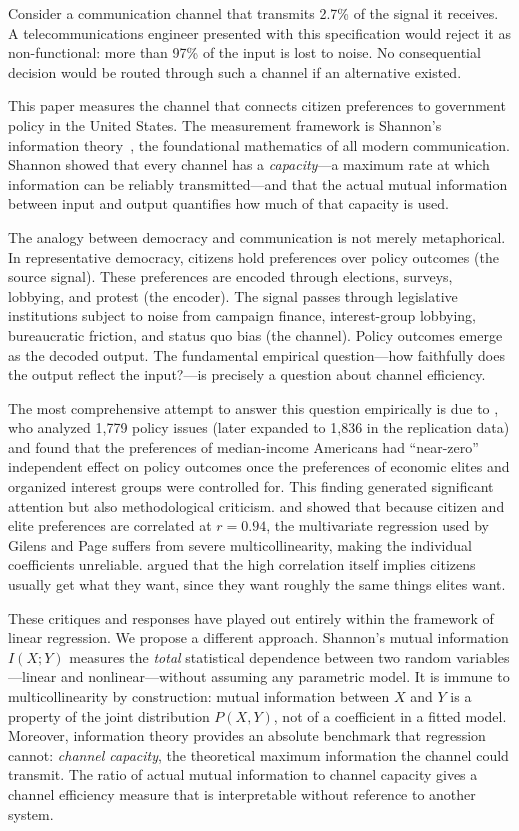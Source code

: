 \documentclass[twocolumn,10pt]{article}
\begin{document}
Consider a communication channel that transmits 2.7\% of the signal it receives.  A telecommunications engineer presented with this specification would reject it as non-functional: more than 97\% of the input is lost to noise.  No consequential decision would be routed through such a channel if an alternative existed.

This paper measures the channel that connects citizen preferences to government policy in the United States.  The measurement framework is Shannon's information theory~\citep{shannon1948}, the foundational mathematics of all modern communication.  Shannon showed that every channel has a \emph{capacity}---a maximum rate at which information can be reliably transmitted---and that the actual mutual information between input and output quantifies how much of that capacity is used.

The analogy between democracy and communication is not merely metaphorical.  In representative democracy, citizens hold preferences over policy outcomes (the source signal).  These preferences are encoded through elections, surveys, lobbying, and protest (the encoder).  The signal passes through legislative institutions subject to noise from campaign finance, interest-group lobbying, bureaucratic friction, and status quo bias (the channel).  Policy outcomes emerge as the decoded output.  The fundamental empirical question---how faithfully does the output reflect the input?---is precisely a question about channel efficiency.

The most comprehensive attempt to answer this question empirically is due to \citet{gilens2014testing}, who analyzed 1,779 policy issues (later expanded to 1,836 in the replication data) and found that the preferences of median-income Americans had ``near-zero'' independent effect on policy outcomes once the preferences of economic elites and organized interest groups were controlled for.  This finding generated significant attention but also methodological criticism.  \citet{bashir2015} and \citet{branham2017} showed that because citizen and elite preferences are correlated at $r = 0.94$, the multivariate regression used by Gilens and Page suffers from severe multicollinearity, making the individual coefficients unreliable.  \citet{enns2015} argued that the high correlation itself implies citizens usually get what they want, since they want roughly the same things elites want.

These critiques and responses have played out entirely within the framework of linear regression.  We propose a different approach.  Shannon's mutual information $I(X;Y)$ measures the \emph{total} statistical dependence between two random variables---linear and nonlinear---without assuming any parametric model.  It is immune to multicollinearity by construction: mutual information between $X$ and $Y$ is a property of the joint distribution $P(X,Y)$, not of a coefficient in a fitted model.  Moreover, information theory provides an absolute benchmark that regression cannot: \emph{channel capacity}, the theoretical maximum information the channel could transmit.  The ratio of actual mutual information to channel capacity gives a channel efficiency measure that is interpretable without reference to another system.
\end{document}
